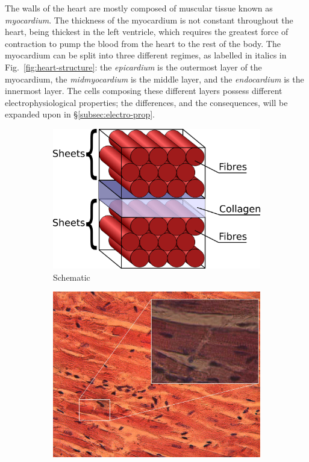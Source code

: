 \documentclass[../thesis-main.tex]{subfiles}
\begin{document}
The walls of the heart are mostly composed of muscular tissue known as \emph{myocardium}. The thickness of the myocardium is not constant throughout the heart, being thickest in the left ventricle, which requires the greatest force of contraction to pump the blood from the heart to the rest of the body. The myocardium can be split into three different regimes, as labelled in italics in Fig.~\ref{fig:heart-structure}: the \emph{epicardium} is the outermost layer of the myocardium, the \emph{midmyocardium} is the middle layer, and the \emph{endocardium} is the innermost layer. The cells composing these different layers possess different electrophysiological properties; the differences, and the consequences, will be expanded upon in \S\ref{subsec:electro-prop}.

\begin{figure}
 \centering
 \begin{subfigure}[b]{0.45\textwidth}
  \centering
  \includegraphics[width=\textwidth]{myocytes}
  \caption{Schematic}
  \label{subfig:myocyte-diagram}
 \end{subfigure}
 \begin{subfigure}[b]{0.45\textwidth}
  \centering
  \includegraphics[width=\textwidth]{myocyte-image}

\end{subfigure}
\end{figure}
\end{document}
